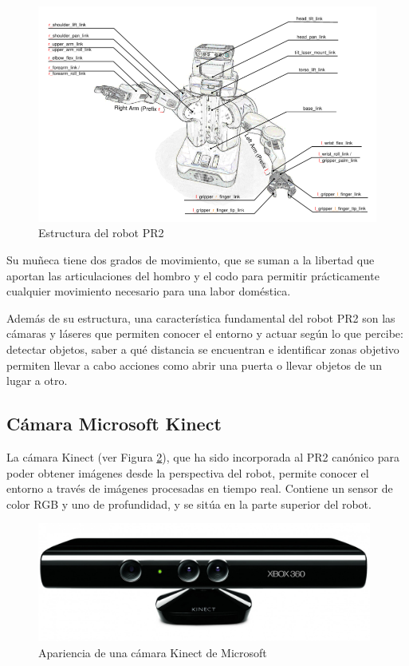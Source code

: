 \documentclass[12pt,spanish,chapterprefix, numbers=noenddot]{book}
\numberwithin{equation}{section}
\numberwithin{figure}{section}
\begin{document}
\begin{figure}[hbt!]
\centering
\includegraphics[width=12cm]{Figs/PR2_structure.png}
\par
\caption{\label{fig:pr2Structure}Estructura del robot PR2}
\end{figure}

Su muñeca tiene dos grados de movimiento, que se suman a la libertad que aportan las articulaciones del hombro y el codo para permitir prácticamente cualquier movimiento necesario para una labor doméstica.

Además de su estructura, una característica fundamental del robot PR2 son las cámaras y láseres que permiten conocer el entorno y actuar según lo que percibe: detectar objetos, saber a qué distancia se encuentran e identificar zonas objetivo permiten llevar a cabo acciones como abrir una puerta o llevar objetos de un lugar a otro.

\subsection{Cámara Microsoft Kinect}
La cámara Kinect (ver Figura \ref{fig:kinect}), que ha sido incorporada al PR2 canónico para poder obtener imágenes desde la perspectiva del robot, permite conocer el entorno a través de imágenes procesadas en tiempo real. 
Contiene un sensor de color RGB y uno de profundidad, y se sitúa en la parte superior del robot. 

\begin{figure}[hbt!]
\centering
\includegraphics[width=11cm]{Figs/kinect.jpg}
\par
\caption{\label{fig:kinect}Apariencia de una cámara Kinect de Microsoft}
\end{figure}
\end{document}
